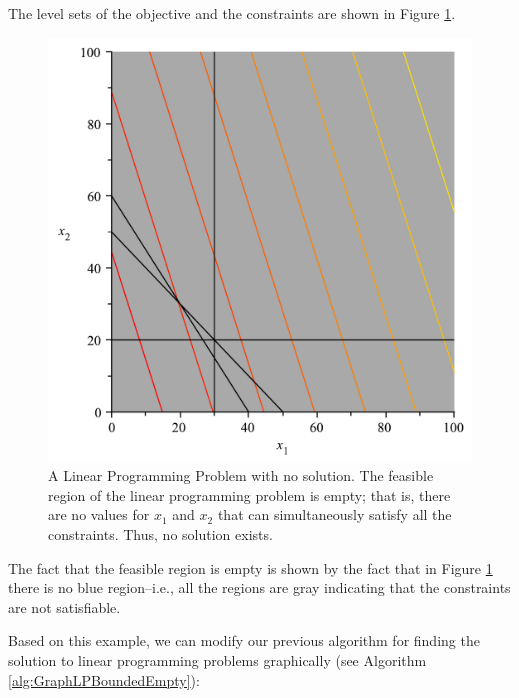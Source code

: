 \begin{solution}
The level sets of the objective and the constraints are shown in Figure \ref{fig:LPInfeasible}. 
\begin{figure}[H]
\centering
\includegraphics[scale=0.4]{LPNoSoln.pdf}
\caption{A Linear Programming Problem with no solution. The feasible region of the linear programming problem is empty; that is, there are no values for $x_1$ and $x_2$ that can simultaneously satisfy all the constraints. Thus, no solution exists.}
\label{fig:LPInfeasible}
\end{figure}

The fact that the feasible region is empty is shown by the fact that in Figure \ref{fig:LPInfeasible} there is no blue region--i.e., all the regions are gray indicating that the constraints are not satisfiable.
\label{ex:LPNoSoln}
\end{solution} 
Based on this example, we can modify our previous algorithm for finding the solution to linear programming problems graphically (see Algorithm \ref{alg:GraphLPBoundedEmpty}):
